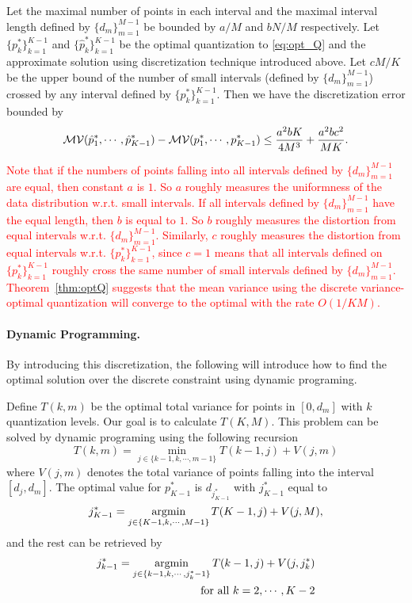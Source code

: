 \begin{theorem} \label{thm:optQ}
Let the maximal number of points in each interval and the maximal interval length defined by $\{d_m\}_{m=1}^{M-1}$ be bounded by $a/M$ and $bN/M$ respectively. Let $\{p^*_k\}_{k=1}^{K-1}$ and $\{\hat{p}^*_k\}_{k=1}^{K-1}$ be the optimal quantization to \eqref{eq:opt_Q} and the approximate solution using discretization technique introduced above. Let $cM/K$ be the upper bound of the number of small intervals (defined by $\{d_m\}_{m=1}^{M-1}$) crossed by any interval defined by $\{p^*_k\}_{k=1}^{K-1}$. Then we have the discretization error bounded by
\[
 \mathcal{MV}(\hat{p}^*_1,\cdots, \hat{p}^*_{K-1}) -  \mathcal{MV}(p^*_1,\cdots, p^*_{K-1}) \leq {a^2b K \over 4 M^3} + {a^2bc^2 \over MK}.
\]
\end{theorem}
\textcolor{red}{Note that if the numbers of points falling into all intervals defined by $\{d_m\}_{m=1}^{M-1}$ are equal, then constant $a$ is $1$. So $a$ roughly measures the uniformness of the data distribution w.r.t. small intervals. If all intervals defined by $\{d_m\}_{m=1}^{M-1}$ have the equal length, then $b$ is equal to $1$. So $b$ roughly measures the distortion from equal intervals w.r.t. $\{d_m\}_{m=1}^{M-1}$. Similarly, $c$ roughly measures the distortion from equal intervals w.r.t. $\{p^*_k\}_{k=1}^{K-1}$, since $c=1$ means that all intervals defined on $\{p^*_k\}_{k=1}^{K-1}$ roughly cross the same number of small intervals defined by $\{d_m\}_{m=1}^{M-1}$. Theorem~\ref{thm:optQ} suggests that the mean variance using the discrete variance-optimal quantization will converge to the optimal with the rate $O(1/KM)$.}

\paragraph*{Dynamic Programming.}

By introducing this discretization, the following will introduce how to find the optimal solution over the discrete constraint using dynamic programing.  

Define $T(k, m)$ be the optimal total variance for points in $[0, d_m]$ with $k$ quantization levels. Our goal is to calculate $T(K, M)$. This problem can be solved by dynamic programing using the following recursion
\[
T(k, m) = \min_{j\in \{k-1, k, \cdots, m-1\}} T(k-1,j) + V(j,m)
\]
where $V(j,m)$ denotes the total variance of points falling into the interval $[d_j, d_m]$. The optimal value for $p_{K-1}^*$ is $ d_{j^*_{K-1}}$ with $j^*_{K-1}$ equal to
\[
j^*_{K-1} = \operatorname*{argmin}_{j\in \{K-1, k, \cdots, M-1\}} T(K-1,j) + V(j,M),
\]
and the rest can be retrieved by 
\begin{align*}
j^*_{k-1} = \operatorname*{argmin}_{j\in \{k-1, k, \cdots, j^*_k-1\}} T(k-1, j) + V(j, j^*_k) \\
\text{for all}~k=2, \cdots, K-2
\end{align*}

